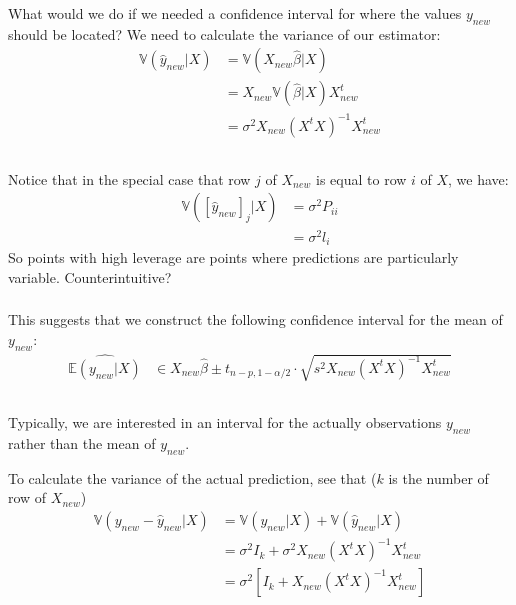 \begin{frame}[fragile] \frametitle{}

What would we do if we needed a confidence interval for where
the values $y_{new}$ should be located? \pause We need to
calculate the variance of our estimator:
\begin{align*}
\mathbb{V} (\hat{y}_{new} | X) &= \mathbb{V} ( X_{new} \widehat{\beta} | X ) \\
&= X_{new} \mathbb{V} (\widehat{\beta} | X) X_{new}^t \\
&= \sigma^2 X_{new} (X^t X)^{-1} X_{new}^t \\
\end{align*}

\end{frame}

\begin{frame}[fragile] \frametitle{}

Notice that in the special case that row $j$ of $X_{new}$ is equal
to row $i$ of $X$, we have:
\begin{align*}
\mathbb{V} (\left[ \hat{y}_{new} \right]_j | X) &= \sigma^2 P_{ii} \\
&= \sigma^2 l_i
\end{align*}
So points with high leverage are points where predictions are
particularly variable. \pause Counterintuitive?

\end{frame}

\begin{frame}[fragile] \frametitle{}

This suggests that we construct the following confidence interval
for the mean of $y_{new}$:
\begin{align*}
\widehat{\mathbb{E}(y_{new} | X)} &\in X_{new} \widehat{\beta} \pm t_{n-p,1-\alpha/2} \cdot
\sqrt{s^2 X_{new} (X^t X)^{-1} X_{new}^t} \\
\end{align*}

\end{frame}

\begin{frame}[fragile] \frametitle{}

Typically, we are interested in an interval for the actually
observations $y_{new}$ rather than the mean of $y_{new}$.

\pause To calculate the variance of the actual prediction,
see that ($k$ is the number of row of $X_{new}$)
\begin{align*}
\mathbb{V} (y_{new} - \hat{y}_{new} | X) &= \mathbb{V} (y_{new} | X) + \mathbb{V} (\hat{y}_{new} | X) \\
&= \sigma^2 I_k + \sigma^2 X_{new} (X^t X)^{-1} X_{new}^t \\
&= \sigma^2 \left[I_k + X_{new} (X^t X)^{-1} X_{new}^t \right]
\end{align*}

\end{frame}

